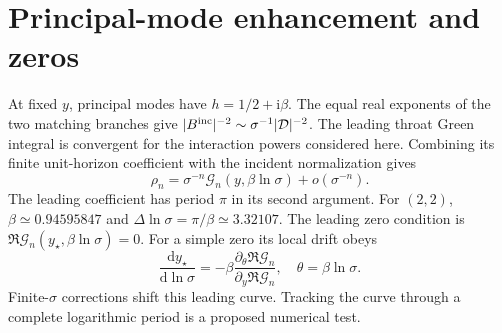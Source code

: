 \documentclass[aps,prd,twocolumn,10pt,nofootinbib,superscriptaddress,floatfix]{revtex4-2}
\newcommand{\ii}{\mathrm{i}}
\newcommand{\dd}{\mathrm{d}}
\begin{document}
\section{Principal-mode enhancement and zeros}
At fixed $y$, principal modes have $h=1/2+\ii\beta$.
The equal real exponents of the two matching branches give
$|B^{\rm inc}|^{-2}\sim\sigma^{-1}|\mathcal D|^{-2}$.
The leading throat Green integral is convergent for the interaction powers
considered here. Combining its finite unit-horizon coefficient with the
incident normalization gives
\begin{equation}
\rho_n=\sigma^{-n}\mathcal G_n(y,\beta\ln\sigma)
+o(\sigma^{-n}).
\end{equation}
The leading coefficient has period $\pi$ in its second argument.
For $(2,2)$, $\beta\simeq0.94595847$ and
$\Delta\ln\sigma=\pi/\beta\simeq3.32107$.
The leading zero condition is $\Re\mathcal G_n(y_\star,\beta\ln\sigma)=0$.
For a simple zero its local drift obeys
\begin{equation}
\frac{\dd y_\star}{\dd\ln\sigma}
=-\beta\frac{\partial_\theta\Re\mathcal G_n}
{\partial_y\Re\mathcal G_n},\quad\theta=\beta\ln\sigma.
\end{equation}
Finite-$\sigma$ corrections shift this leading curve. Tracking the curve
through a complete logarithmic period is a proposed numerical test.
\end{document}
